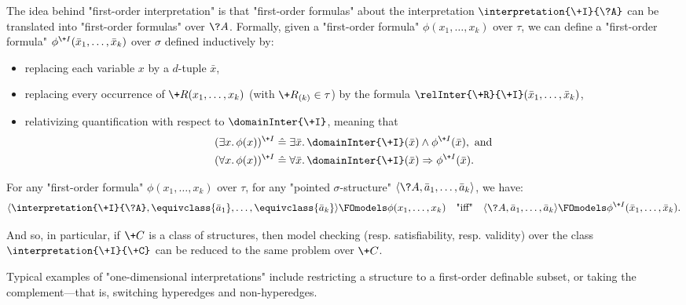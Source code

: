 The idea behind "first-order interpretation" is that
"first-order formulas" about the interpretation $\interpretation{\+I}{\?A}$
can be translated into "first-order formulas" over $\?A$.
Formally, given a "first-order formula" $\phi(x_1,\dotsc,x_k)$ over $\tau$,
we can define a "first-order formula" $\phi^{\+I}(\bar x_1,\dotsc,\bar x_k)$ over $\sigma$
defined inductively by:
\begin{itemize}
	\item replacing each variable $x$ by a $d$-tuple $\bar x$,
	\item replacing every occurrence of
		$\+R(x_1,\dotsc, x_k)$ (with $\+R_{(k)} \in \tau$)
		by the formula $\relInter{\+R}{\+I}(\bar x_1, \dotsc, \bar x_k)$,
	\item relativizing quantification with respect to $\domainInter{\+I}$,
		meaning that
		\begin{align*}
			(\exists x.\, \phi(x))^{\+I} 
			& \defeq \exists \bar x.\, \domainInter{\+I}(\bar x) \land \phi^{\+I}(\bar x),
			\text{ and} \\ 
			(\forall x.\, \phi(x))^{\+I} 
			& \defeq \forall \bar x.\, \domainInter{\+I}(\bar x) \Rightarrow \phi^{\+I}(\bar x).
		\end{align*}
\end{itemize} 
\begin{proposition}
	\AP\label{prop:first-order-interpretation}
	For any "first-order formula" $\phi(x_1,\dotsc,x_k)$ over $\tau$,
	for any "pointed $\sigma$-structure" $\tup{\?A, \bar a_1,\dotsc, \bar a_k}$, we have:
	\[
		\tup{\interpretation{\+I}{\?A}, \equivclass{\bar a_1}, \dotsc, \equivclass{\bar a_k}}
		\FOmodels \phi(x_1, \dotsc, x_k)
		\quad\text{"iff"}\quad
		\tup{\?A, \bar a_1,\dotsc, \bar a_k} \FOmodels \phi^{\+I}(\bar x_1,\dotsc,\bar x_k).
	\]
\end{proposition}
And so, in particular, if $\+C$ is a class of structures, then
model checking (resp. satisfiability, resp. validity) over the class $\interpretation{\+I}{\+C}$
can be reduced to the same problem over $\+C$.

Typical examples of "one-dimensional interpretations" include
restricting a structure to a first-order definable subset, 
or taking the complement---that is, switching hyperedges and non-hyperedges.

